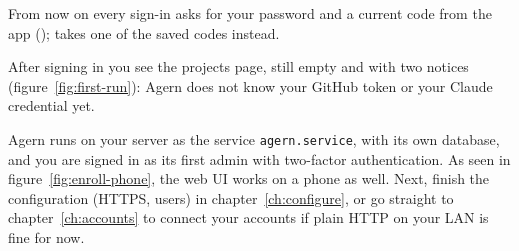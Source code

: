 From now on every sign-in asks for your password and a current code from the app
();  takes one of the saved codes instead.





After signing in you see the projects page, still empty and with two notices
(figure~\ref{fig:first-run}): Agern does not know your GitHub token or your Claude credential yet.


\whatyouhave
Agern runs on your server as the service \texttt{agern.service}, with its own database, and you
are signed in as its first admin with two-factor authentication. As seen in
figure~\ref{fig:enroll-phone}, the web UI works on a phone as well. Next, finish the
configuration (HTTPS, users) in chapter~\ref{ch:configure}, or go straight to
chapter~\ref{ch:accounts} to connect your accounts if plain HTTP on your LAN is fine for now.
